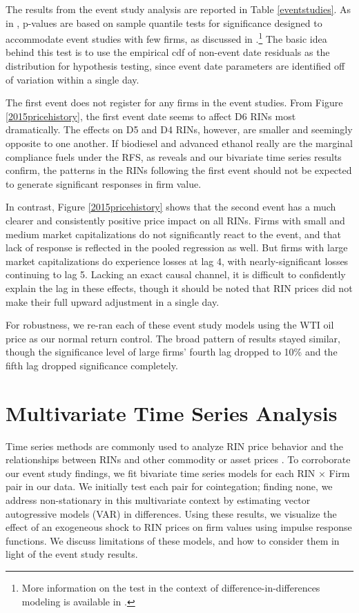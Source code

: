 \documentclass[11pt]{article}
\begin{document}
The results from the event study analysis are reported in Table \ref{eventstudies}. As in \cite{Lade2018a}, p-values are based on sample quantile tests for significance designed to accommodate event studies with few firms, as discussed in \cite{Gelbach2013}.\footnote{More information on the test in the context of difference-in-differences modeling is available in \cite{Conley2011}.} The basic idea behind this test is to use the empirical cdf of non-event date residuals as the distribution for hypothesis testing, since event date parameters are identified off of variation within a single day.

The first event does not register for any firms in the event studies. From Figure \ref{2015pricehistory}, the first event date seems to affect D6 RINs most dramatically. The effects on D5 and D4 RINs, however, are smaller and seemingly opposite to one another. If biodiesel and advanced ethanol really are the marginal compliance fuels under the RFS, as \cite{Lade2018a} reveals and our bivariate time series results confirm, the patterns in the RINs following the first event should not be expected to generate significant responses in firm value.

In contrast, Figure \ref{2015pricehistory} shows that the second event has a much clearer and consistently positive price impact on all RINs. Firms with small and medium market capitalizations do not significantly react to the event, and that lack of response is reflected in the pooled regression as well. But firms with large market capitalizations do experience losses at lag 4, with nearly-significant losses continuing to lag 5. Lacking an exact causal channel, it is difficult to confidently explain the lag in these effects, though it should be noted that RIN prices did not make their full upward adjustment in a single day. 

For robustness, we re-ran each of these event study models using the WTI oil price as our normal return control. The broad pattern of results stayed similar, though the significance level of large firms' fourth lag dropped to 10\% and the fifth lag dropped significance completely. 


\section{Multivariate Time Series Analysis}

Time series methods are commonly used to analyze RIN price behavior  \citep{Mason2016} and the relationships between RINs and other commodity or asset prices \citep{Serra2011, Whistance2014, Whistance2016, Knittel2017}. To corroborate our event study findings, we fit bivariate time series models for each RIN $\times$ Firm pair in our data. We initially test each pair for cointegation; finding none, we address non-stationary in this multivariate context by estimating vector autogressive models (VAR) in differences. Using these results, we visualize the effect of an exogeneous shock to RIN prices on firm values using impulse response functions. We discuss limitations of these models, and how to consider them in light of the event study results.
\end{document}
